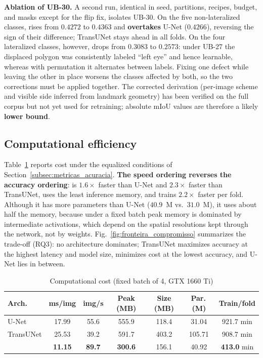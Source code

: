 \textbf{Ablation of UB-30.}
A second run, identical in seed, partitions, recipes, budget, and masks except for the flip fix, isolates UB-30.
On the five non-lateralized classes, \swinp{} rises from $0.4272$ to $0.4363$ and \textbf{overtakes} U-Net ($0.4266$), reversing the sign of their difference; TransUNet stays ahead in all folds.
On the four lateralized classes, however, \swinp{} drops from $0.3083$ to $0.2573$: under UB-27 the displaced polygon was consistently labeled ``left eye'' and hence learnable, whereas with permutation it alternates between labels.
Fixing one defect while leaving the other in place worsens the classes affected by both, so the two corrections must be applied together.
The corrected derivation (per-image scheme and visible side inferred from landmark geometry) has been verified on the full corpus but not yet used for retraining; absolute mIoU values are therefore a likely \textbf{lower bound}.

\subsection{Computational efficiency} \label{sec:res_eficiencia}

Table~\ref{tab:custo_computacional} reports cost under the equalized conditions of Section~\ref{subsec:metricas_acuracia}.
\textbf{The speed ordering reverses the accuracy ordering}: \swinp{} is $1.6\times$ faster than U-Net and $2.3\times$ faster than TransUNet, uses the least inference memory, and trains $2.2\times$ faster per fold.
Although it has more parameters than U-Net ($40.9$~M vs.\ $31.0$~M), it uses about half the memory, because under a fixed batch peak memory is dominated by intermediate activations, which depend on the spatial resolutions kept through the network, not by weights.
Fig.~\ref{fig:fronteira_compromisso} summarizes the trade-off (RQ3): no architecture dominates; TransUNet maximizes accuracy at the highest latency and model size, \swinp{} minimizes cost at the lowest accuracy, and U-Net lies in between.

\begin{table}[tbp]
\centering
\caption{Computational cost (fixed batch of 4, GTX 1660 Ti)}
\label{tab:custo_computacional}
\footnotesize
\setlength{\tabcolsep}{2.5pt}
\begin{tabular}{@{}lcccccc@{}}
\toprule
\textbf{Arch.} & \textbf{ms/img} & \textbf{img/s} & \textbf{Peak (MB)} & \textbf{Size (MB)} & \textbf{Par.\,(M)} & \textbf{Train/fold} \\
\midrule
U-Net & 17.99 & 55.6 & 555.9 & 118.4 & 31.04 & 921.7 min \\
TransUNet & 25.53 & 39.2 & 591.7 & 403.2 & 105.71 & 908.7 min \\
\swint{} & \textbf{11.15} & \textbf{89.7} & \textbf{300.6} & 156.1 & 40.92 & \textbf{413.0} min \\
\bottomrule
\end{tabular}
\end{table}

